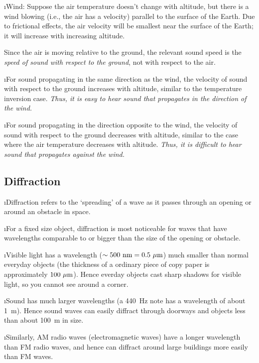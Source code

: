 \i Wind: 
Suppose the air temperature doesn't change with 
altitude, but there is a wind blowing (i.e., the air 
has a velocity) parallel to the surface of the Earth.
Due to frictional effects, the air velocity will 
be smallest near the surface of the Earth; 
it will increase with increasing altitude.

Since the air is moving relative to the ground,
the relevant sound speed is the {\em speed of sound 
with respect to the ground}, not with respect to 
the air.

\i \ex For sound propagating in the same direction 
as the wind, the velocity of sound with respect to the ground 
increases with altitude, similar to the temperature inversion case.
{\em Thus, it is easy to hear sound that propagates 
in the direction of the wind.}

\i \ex For sound propagating in the direction opposite 
to the wind, the velocity of sound with respect to the ground 
decreases with altitude, similar to 
the case where the air temperature decreases with altitude.
{\em Thus, it is difficult to hear sound that propagates
against the wind.}


\ei
\subsection{Diffraction}
\bi

\i Diffraction refers to the `spreading' of a wave as
it passes through an opening or around an obstacle 
in space.

\i For a fixed size object, diffraction is most noticeable
for waves that have wavelengths comparable to or bigger
than the size of the opening or obstacle.

\i Visible light has a wavelength 
($\sim 500~{\rm nm} = 0.5~\mu{\rm m}$)
much smaller than normal everyday objects
(the thickness of a ordinary piece of copy paper is 
approximately $100~\mu{\rm m}$).
Hence everday objects cast sharp shadows for visible
light, so you cannot see around a corner.

\i Sound has much larger wavelengths (a 440~Hz note
has a wavelength of about 1~m).
Hence sound waves can easily diffract through doorways
and objects less than about 100~m in size.

\i Similarly, AM radio waves (electromagnetic waves) 
have a longer 
wavelength than FM radio waves, and hence can diffract 
around large buildings more easily than FM waves.

